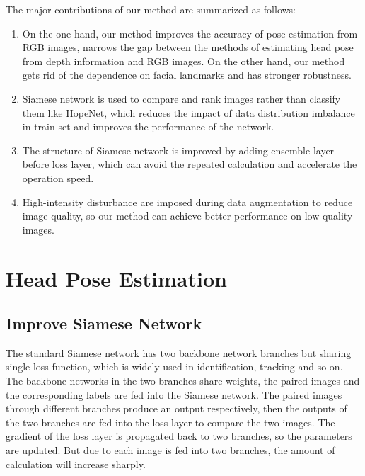 \documentclass[english]{DDCLSconf}
\begin{document}
The major contributions of our method are summarized as follows:
\begin{enumerate}
	\item On the one hand, our method improves the accuracy of pose estimation from RGB images, narrows the gap between the methods of estimating head pose from depth information and RGB images. On the other hand, our method gets rid of the dependence on facial landmarks and has stronger robustness.
	\item Siamese network is used to compare and rank images rather than classify them like HopeNet, which reduces the impact of data distribution imbalance in train set and improves the performance of the network.
	\item The structure of Siamese network is improved by adding ensemble layer before loss layer, which can avoid the repeated calculation and accelerate the operation speed.
	\item High-intensity disturbance are imposed during data augmentation to reduce image quality, so our method can achieve better performance on low-quality images.
\end{enumerate}

\section{Head Pose Estimation}

\subsection{Improve Siamese Network}

The standard Siamese network has two backbone network branches but sharing single loss function, which is widely used in identification, tracking and so on. The backbone networks in the two branches share weights, the paired images and the corresponding labels are fed into the Siamese network. The paired images through different branches produce an output respectively, then the outputs of the two branches are fed into the loss layer to compare the two images. The gradient of the loss layer is propagated back to two branches, so the parameters are updated. But due to each image is fed into two branches, the amount of calculation will increase sharply.  
\end{document}
